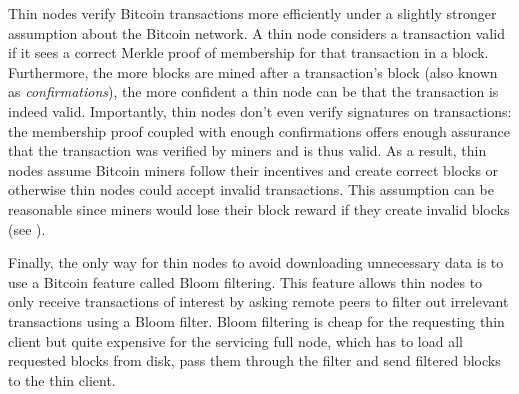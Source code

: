 Thin nodes verify Bitcoin transactions more efficiently under a slightly stronger assumption about the Bitcoin network.
A thin node considers a transaction valid if it sees a correct Merkle proof of membership for that transaction in a block.
Furthermore, the more blocks are mined after a transaction's block (also known as \emph{confirmations}), the more confident a thin node can be that the transaction is indeed valid.
Importantly, thin nodes don't even verify signatures on transactions: the membership proof coupled with enough confirmations offers enough assurance that the transaction was verified by miners and is thus valid.
As a result, thin nodes assume Bitcoin miners follow their incentives and create correct blocks or otherwise thin nodes could accept invalid transactions.
This assumption can be reasonable since miners would lose their block reward if they create invalid blocks (see ).

Finally, the only way for thin nodes to avoid downloading unnecessary data is to use a Bitcoin feature called Bloom filtering\cite{bitcoin-bloom}.
This feature allows thin nodes to only receive transactions of interest by asking remote peers to filter out irrelevant transactions using a Bloom filter\cite{bloom}.
Bloom filtering is cheap for the requesting thin client but quite expensive for the servicing full node, which has to load all requested blocks from disk, pass them through the filter and send filtered blocks to the thin client.